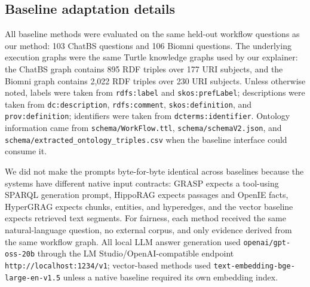 
\subsection{Baseline adaptation details}\label{app:baseline-adaptation}

All baseline methods were evaluated on the same held-out workflow questions as
our method: 103 ChatBS questions and 106 Biomni questions. The underlying
execution graphs were the same Turtle knowledge graphs used by our explainer:
the ChatBS graph contains 895 RDF triples over 177 URI subjects, and the Biomni
graph contains 2,022 RDF triples over 230 URI subjects. Unless otherwise noted,
labels were taken from \texttt{rdfs:label} and \texttt{skos:prefLabel};
descriptions were taken from \texttt{dc:description}, \texttt{rdfs:comment},
\texttt{skos:definition}, and \texttt{prov:definition}; identifiers were taken
from \texttt{dcterms:identifier}. Ontology information came from
\texttt{schema/WorkFlow.ttl}, \texttt{schema/schemaV2.json}, and
\texttt{schema/extracted\_ontology\_triples.csv} when the baseline interface
could consume it.

We did not make the prompts byte-for-byte identical across baselines because
the systems have different native input contracts: GRASP expects a
tool-using SPARQL generation prompt, HippoRAG expects passages and OpenIE
facts, HyperGRAG expects chunks, entities, and hyperedges, and the vector
baseline expects retrieved text segments. For fairness, each method received
the same natural-language question, no external corpus, and only evidence
derived from the same workflow graph. All local LLM answer generation used
\texttt{openai/gpt-oss-20b} through the LM Studio/OpenAI-compatible endpoint
\texttt{http://localhost:1234/v1}; vector-based methods used
\texttt{text-embedding-bge-large-en-v1.5} unless a native baseline required its
own embedding index.

